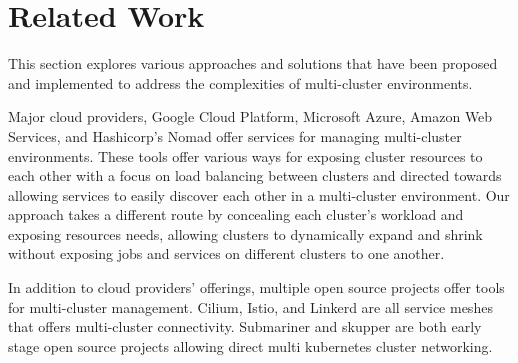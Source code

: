 
\chapter{Related Work}

%
%
%
%
%
%
%
%
%
%
%
%
This section explores various approaches and solutions that have been proposed and implemented to address the complexities of multi-cluster environments.

Major cloud providers, Google Cloud Platform, Microsoft Azure, Amazon Web
Services, and Hashicorp's Nomad offer services for managing multi-cluster
environments. These tools offer various ways for exposing cluster resources to
each other with a focus on load balancing between clusters and directed towards
allowing services to easily discover each other in a multi-cluster environment.
Our approach takes a different route by concealing each cluster's workload and
exposing resources needs, allowing clusters to dynamically expand and shrink
without exposing jobs and services on different clusters to one another.  

In addition to cloud providers' offerings, multiple open source projects 
offer tools for multi-cluster management. Cilium, Istio, and Linkerd are
all service meshes that offers multi-cluster connectivity. 
Submariner and skupper are both early stage open source projects allowing
direct multi kubernetes cluster networking. 

